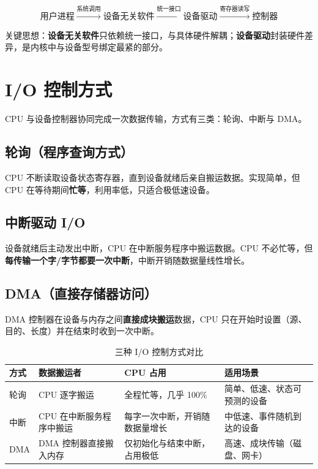 \begin{equation}
\text{用户进程} \xrightarrow{\text{系统调用}} \text{设备无关软件} \xrightarrow{\text{统一接口}} \text{设备驱动} \xrightarrow{\text{寄存器读写}} \text{控制器}
\end{equation}

关键思想：\textbf{设备无关软件}只依赖统一接口，与具体硬件解耦；\textbf{设备驱动}封装硬件差异，是内核中与设备型号绑定最紧的部分。

\section{I/O 控制方式}

CPU 与设备控制器协同完成一次数据传输，方式有三类：轮询、中断与 DMA。

\subsection{轮询（程序查询方式）}

CPU 不断读取设备状态寄存器，直到设备就绪后亲自搬运数据。实现简单，但 CPU 在等待期间\textbf{忙等}，利用率低，只适合极低速设备。

\subsection{中断驱动 I/O}

设备就绪后主动发出中断，CPU 在中断服务程序中搬运数据。CPU 不必忙等，但\textbf{每传输一个字/字节都要一次中断}，中断开销随数据量线性增长。

\subsection{DMA（直接存储器访问）}

DMA 控制器在设备与内存之间\textbf{直接成块搬运}数据，CPU 只在开始时设置（源、目的、长度）并在结束时收到一次中断。

\begin{table}[H]
\centering
\caption{三种 I/O 控制方式对比}
\begin{tabulary}{\textwidth}{LLLL}
\toprule
方式 & 数据搬运者 & CPU 占用 & 适用场景 \\
\midrule
轮询 & CPU 逐字搬运 & 全程忙等，几乎 100\% & 简单、低速、状态可预测的设备 \\
中断 & CPU 在中断服务程序中搬运 & 每字一次中断，开销随数据量增长 & 中低速、事件随机到达的设备 \\
DMA & DMA 控制器直接搬入内存 & 仅初始化与结束中断，占用极低 & 高速、成块传输（磁盘、网卡） \\
\bottomrule
\end{tabulary}
\end{table}

